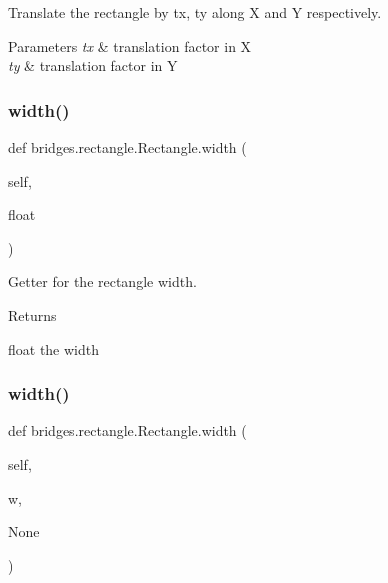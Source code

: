 Translate the rectangle by tx, ty along X and Y respectively. 


\begin{DoxyParams}{Parameters}
{\em tx} & translation factor in X \\
\hline
{\em ty} & translation factor in Y \\
\hline
\end{DoxyParams}
\mbox{\label{classbridges_1_1rectangle_1_1_rectangle_a862f1154bb5e73c1811c38e7871f93a5}} 
\subsubsection{\texorpdfstring{width()}{width()}\hspace{0.1cm}{\footnotesize\ttfamily [1/2]}}
{\footnotesize\ttfamily def bridges.\+rectangle.\+Rectangle.\+width (\begin{DoxyParamCaption}\item[{}]{self,  }\item[{}]{float }\end{DoxyParamCaption})}



Getter for the rectangle width. 

\begin{DoxyReturn}{Returns}


float the width 
\end{DoxyReturn}
\mbox{\label{classbridges_1_1rectangle_1_1_rectangle_a6b4b58e7312278fdc5d314bd574096bc}} 
\subsubsection{\texorpdfstring{width()}{width()}\hspace{0.1cm}{\footnotesize\ttfamily [2/2]}}
{\footnotesize\ttfamily def bridges.\+rectangle.\+Rectangle.\+width (\begin{DoxyParamCaption}\item[{}]{self,  }\item[{}]{w,  }\item[{}]{None }\end{DoxyParamCaption})}



